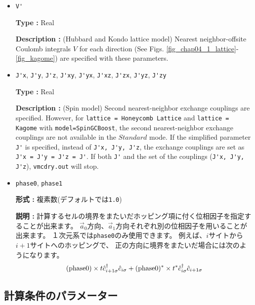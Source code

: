 \begin{itemize}
\item \verb|V'|

{\bf Type :} Real

{\bf Description :} (Hubbard and Kondo lattice model)
Nearest neighbor-offsite Coulomb integrals $V$
 for each direction
(See Figs. \ref{fig_chap04_1_lattice}-\ref{fig_kagome})
are specified with these parameters.

\item \verb|J'x|, \verb|J'y|, \verb|J'z|, \verb|J'xy|, 
  \verb|J'yx|, \verb|J'xz|, \verb|J'zx|, \verb|J'yz|, \verb|J'zy|

{\bf Type :} Real

{\bf Description :} (Spin model)
Second nearest-neighbor exchange couplings are specified.
However, for \verb|lattice = Honeycomb Lattice| and  \verb|lattice = Kagome|
with \verb|model=SpinGCBoost|,
the second nearest-neighbor exchange couplings are not available in the $Standard$ mode.
If the simplified parameter \verb|J'| is specified, instead of
\verb|J'x, J'y, J'z|,
the exchange couplings are set as
\verb|J'x = J'y = J'z = J'|.
If both \verb|J'| and the set of the couplings (\verb|J'x, J'y, J'z|),
\verb|vmcdry.out| will stop.

\item \verb|phase0|, \verb|phase1|

  {\bf 形式 :} 複素数(デフォルトでは\verb|1.0|)
  
  {\bf 説明 :} 計算するセルの境界をまたいだホッピング項に付く位相因子を指定することが出来ます。
  $\vec{a}_0$方向、$\vec{a}_1$方向それぞれ別の位相因子を用いることが出来ます。
  １次元系では\verb|phase0|のみ使用できます。
  例えば、$i$サイトから$i+1$サイトへのホッピングで、
  正の方向に境界をまたいだ場合には次のようになります。
  \begin{align}
    ({\rm phase0}) \times t {\hat c}_{i+1 \sigma}^\dagger {\hat c}_{i \sigma}
    + ({\rm phase0})^* \times t^* {\hat c}_{i \sigma}^\dagger {\hat c}_{i+1 \sigma}
  \end{align}

\end{itemize}

\subsection{計算条件のパラメーター}

